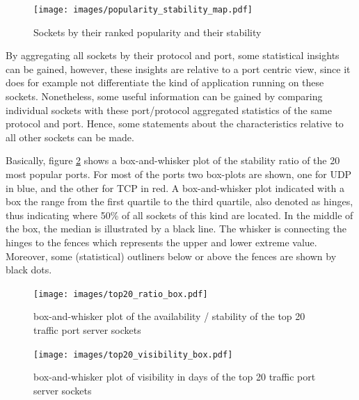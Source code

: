 \begin{figure}
	[ht] \centering
	\texttt{[image: images/popularity\_stability\_map.pdf]}
	\caption{Sockets by their ranked popularity and their stability}
	\label{fig:rankedPopularity}
\end{figure}

By aggregating all sockets by their protocol and port, some statistical insights  
can be gained, however, these insights are relative to a port centric view, 
since it does for example not differentiate the kind of application running on 
these sockets. Nonetheless, some useful information can be gained by comparing 
individual sockets with these port/protocol aggregated 
statistics of the same protocol and port. Hence, some statements about the 
characteristics relative to all other sockets can be made.

Basically, figure \ref{fig:top20_ratio_box} shows a box-and-whisker plot of 
the stability ratio of the 20 most popular ports. For most of the ports two 
box-plots are shown, one for \gls{UDP} in blue, and the other for \gls{TCP} in 
red. A box-and-whisker plot indicated with a box the range from the first 
quartile to the third quartile, also denoted as hinges, thus indicating where 
50\% of all sockets of this kind are located. In the middle of the box, the 
median is illustrated by a black line. The whisker is connecting the hinges to 
the fences which represents the upper and lower extreme value. Moreover, some 
(statistical) outliners below or above the fences are shown by black dots.

\begin{landscape}
	\begin{figure}
	[p] \centering
	\texttt{[image: images/top20\_ratio\_box.pdf]}
	\caption{box-and-whisker plot of the availability / stability of the top 20 traffic port server sockets}
	\label{fig:top20_ratio_box}
\end{figure}
\end{landscape}

\begin{landscape}
\begin{figure}
	[p] \centering
	\texttt{[image: images/top20\_visibility\_box.pdf]}
	\caption{box-and-whisker plot of visibility in days of the top 20 traffic port server sockets}
	\label{fig:top20_visibledays_box}
\end{figure}
\end{landscape}


